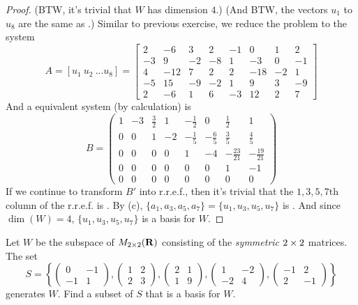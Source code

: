 \begin{proof}
(BTW, it's trivial that \(W\) has dimension \(4\).)
(And BTW, the vectors \(u_1\) to \(u_8\) are the same as .)
Similar to previous exercise, we reduce the problem to the system
\[
    A = [u_1\ u_2\ ... u_8] =
    \left[\begin{array}{cccccccc}
        2 & -6 & 3 & 2 & -1 & 0 & 1 & 2 \\
        -3 & 9 & -2 & -8 & 1 & -3 & 0 & -1 \\
        4 & -12 & 7 & 2 & 2 & -18 & -2 & 1 \\
        -5 & 15 & -9 & -2 & 1 & 9 & 3 & -9 \\
        2 & -6 & 1 & 6 & -3 & 12 & 2 & 7
    \end{array}\right]
\]
And a equivalent system (by calculation) is
\[
    B = \left(\begin{array}{cccccccc}
        1 & -3 & \frac{3}{2} & 1 & -\frac{1}{2} & 0 & \frac{1}{2} & 1 \\
        0 & 0 & 1 & -2 & -\frac{1}{5} & -\frac{6}{5} & \frac{3}{5} & \frac{4}{5} \\
        0 & 0 & 0 & 0 & 1 & -4 & -\frac{23}{21} & -\frac{19}{21} \\
        0 & 0 & 0 & 0 & 0 & 0 & 1 & -1 \\
        0 & 0 & 0 & 0 & 0 & 0 & 0 & 0
    \end{array}\right)
\]
If we continue to transform \(B'\) into r.r.e.f., then it's trivial that the \(1, 3, 5, 7\)th column of the r.r.e.f. is \LID{}.
By (c), \(\{ a_1, a_3, a_5, a_7 \} =\{ u_1, u_3, u_5, u_7 \}\) is \LID{}.
And since \(\dim(W) = 4\), \(\{ u_1, u_3, u_5, u_7 \}\) is a basis for \(W\).
\end{proof}

\begin{exercise} \label{exercise 3.4.9}
Let \(W\) be the subspace of \(M_{2 \times 2}(\mathbf{R})\) consisting of the \emph{symmetric} \(2 \times 2\) matrices.
The set
\[
    S= \left\{
        \left(\begin{array}{rr}
            0 & -1 \\
            -1 & 1
        \end{array}\right),
        \left(\begin{array}{ll}
            1 & 2 \\
            2 & 3
        \end{array}\right),
        \left(\begin{array}{ll}
            2 & 1 \\
            1 & 9
        \end{array}\right),
        \left(\begin{array}{rr}
            1 & -2 \\
            -2 & 4
        \end{array}\right),
        \left(\begin{array}{rr}
            -1 & 2 \\
            2 & -1
        \end{array}\right)
    \right\}
\]
generates \(W\).
Find a subset of \(S\) that is a basis for \(W\).
\end{exercise}

